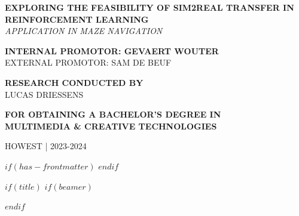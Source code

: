 \documentclass[12pt]{article}
\begin{document}
\begin{titlepage}
    \begin{adjustwidth}{1.5cm}{1.5cm}

    \MakeUppercase{\huge\textbf{Exploring the Feasibility of Sim2Real Transfer in Reinforcement Learning}} \\
    \MakeUppercase{\Large\textit{Application in Maze Navigation}}

    \vspace{1.25em}

    \noindent\MakeUppercase{\large\textbf{Internal promotor: Gevaert Wouter}} \\
    \MakeUppercase{\large{External promotor: Sam De beuf}}

    \vspace{1.25em}

    \noindent\MakeUppercase{\large\textbf{Research conducted by}} \\
    \MakeUppercase{\Large{Lucas Driessens}}

    \vspace{1.25em}

    \noindent\MakeUppercase{\large\textbf{for obtaining a bachelor's degree in}} \\
    \MakeUppercase{\Large\textbf{Multimedia \& Creative Technologies}}

    \vspace{0.75em}

    \noindent\MakeUppercase{\large{Howest | 2023-2024}}
    \end{adjustwidth}
    \restoregeometry
    \normalfont
\end{titlepage}

\newpage


\renewcommand{\familydefault}{\rmdefault}
\setmainfont{TeX Gyre Pagella} %
\fontsize{11pt}{14pt}\selectfont



$if(has-frontmatter)$
$endif$

$if(title)$
$if(beamer)$
\frame{\titlepage}

\tableofcontents

$endif$

\setcounter{section}{0}
\end{document}
